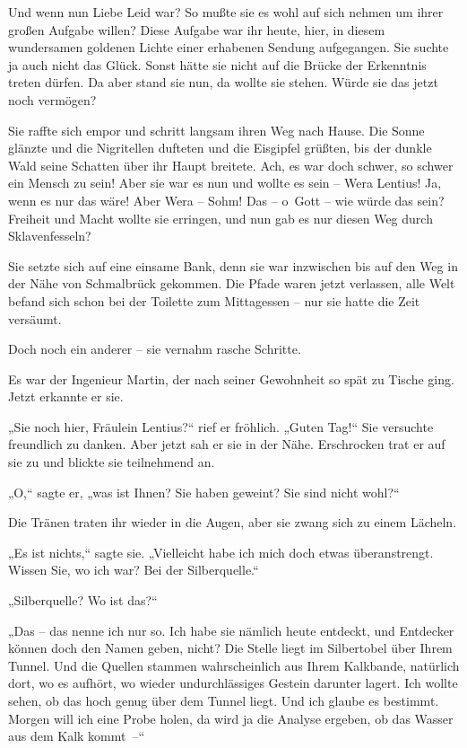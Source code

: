 Und wenn nun Liebe Leid war? So mußte sie es wohl auf sich nehmen
um ihrer großen Aufgabe willen? Diese Aufgabe war ihr heute, hier,
in diesem wundersamen goldenen Lichte einer erhabenen Sendung
aufgegangen. Sie suchte ja auch nicht das Glück. Sonst hätte sie
nicht auf die Brücke der Erkenntnis treten dürfen. Da aber stand
sie nun, da wollte sie stehen. Würde sie das jetzt noch vermögen?

Sie raffte sich empor und schritt langsam ihren Weg nach Hause. Die
Sonne glänzte und die Nigritellen dufteten und die Eisgipfel
grüßten, bis der dunkle Wald seine Schatten über ihr Haupt
breitete. Ach, es war doch schwer, so schwer ein Mensch zu sein!
Aber sie war es nun und wollte es sein – Wera Lentius! Ja, wenn es
nur das wäre! Aber Wera – Sohm! Das – o~Gott – wie würde das sein?
Freiheit und Macht wollte sie erringen, und nun gab es nur diesen
Weg durch Sklavenfesseln?

Sie setzte sich auf eine einsame Bank, denn sie war inzwischen bis
auf den Weg in der Nähe von Schmalbrück gekommen. Die Pfade waren
jetzt verlassen, alle Welt befand sich schon bei der Toilette zum
Mittagessen – nur sie hatte die Zeit versäumt.

Doch noch ein anderer – sie vernahm rasche Schritte.

Es war der Ingenieur Martin, der nach seiner Gewohnheit so spät zu
Tische ging. Jetzt erkannte er sie.

„Sie noch hier, Fräulein Lentius?“ rief er fröhlich. „Guten Tag!“
Sie versuchte freundlich zu danken. Aber jetzt sah er sie in der
Nähe. Erschrocken trat er auf sie zu und blickte sie teilnehmend
an.

„O,“ sagte er, „was ist Ihnen? Sie haben geweint? Sie sind nicht
wohl?“

Die Tränen traten ihr wieder in die Augen, aber sie zwang sich zu
einem Lächeln.

„Es ist nichts,“ sagte sie. „Vielleicht habe ich mich doch etwas
überanstrengt. Wissen Sie, wo ich war? Bei der Silberquelle.“

„Silberquelle? Wo ist das?“

„Das – das nenne ich nur so. Ich habe sie nämlich heute entdeckt,
und Entdecker können doch den Namen geben, nicht? Die Stelle liegt
im Silbertobel über Ihrem Tunnel. Und die Quellen stammen
wahrscheinlich aus Ihrem Kalkbande, natürlich dort, wo es aufhört,
wo wieder undurchlässiges Gestein darunter lagert. Ich wollte
sehen, ob das hoch genug über dem Tunnel liegt. Und ich glaube es
bestimmt. Morgen will ich eine Probe holen, da wird ja die Analyse
ergeben, ob das Wasser aus dem Kalk kommt~–“

